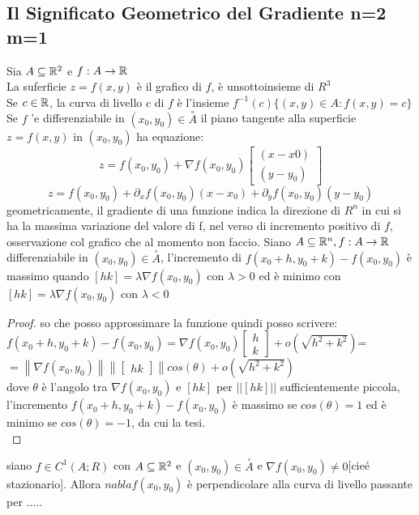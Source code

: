\subsection{Il Significato Geometrico del Gradiente n=2 m=1}
Sia $A\subseteq \mathbb{R}^2$ e $f:A\rightarrow \mathbb{R}$\\
La suferficie $z=f(x,y)$ è il grafico di $f$, è unsottoinsieme di $R^3$\\
Se $c\in \mathbb{R}$, la curva di livello $c$ di $f$ è l'insieme $f^{-1}(c)\{(x,y)\in A: f(x,y)=c\}$\\
Se $f$ 	'e differenziabile in $(x_0,y_0)\in\overset{\circ}{A}$ il piano tangente alla superficie $z=f(x,y)$ in $(x_0,y_0)$ ha equazione:\\
$$z=f(x_0,y_0)+\nabla f(x_0,y_0)\begin{bmatrix}(x-x0)\\(y-y_0)\end{bmatrix}$$ 
$$z=f(x_0,y_0)+\partial_xf(x_0,y_0)(x-x_0)+\partial_yf(x_0,y_0)(y-y_0)$$
\observation
geometricamente, il gradiente di una funzione indica la direzione di $R^n$ in cui si ha la massima variazione del valore di f, nel verso di incremento positivo di $f$,
\observation 
osservazione col grafico che al momento non faccio.
\proposition
Siano $A\subseteq \mathbb{R}^n, f:A\rightarrow \mathbb{R}$ differenziabile in $(x_0,y_0)\in \overset{\circ}{A}$, l'incremento di $f(x_0+h,y_0+k)-f(x_0,y_0)$ è massimo quando $[h k]=\lambda\nabla f(x_0,y_0)$ con $\lambda >0$ ed è minimo con $[h k]=\lambda\nabla f(x_0,y_0)$ con $\lambda <0$
\begin{proof}
	so che posso approssimare la funzione quindi posso scrivere:\\
	$f(x_0+h,y_0+k)-f(x_0,y_0)=\nabla f(x_0,y_0)\begin{bmatrix}h\\k\end{bmatrix}+o(\sqrt{h^2+k^2})$=
	$=\left\| \nabla f(x_0,y_0) \right\|\left\|\begin{bmatrix}h k\end{bmatrix}\right\|cos(\theta)+o(\sqrt{h^2+k^2})$\\
	dove $\theta$ è l'angolo tra $\nabla f(x_0,y_0)$ e $[h k]$ per $||[h k]||$ sufficientemente piccola, l'incremento $f(x_0+h,y_0+k)-f(x_0,y_0)$ è massimo se $cos( \theta )=1$ ed è minimo se $cos(\theta )=-1$, da cui la tesi.\\ 
\end{proof}
\proposition
siano $f\in C^1(A;R)$ con $A\subseteq \mathbb{R}^2$ e $(x_0,y_0)\in\overset{\circ}{A}$ e $\nabla f(x_0,y_0)\ne 0$[cie\'e stazionario]. Allora $nabla f(x_0,y_0)$ è perpendicolare alla curva di livello passante per .....
